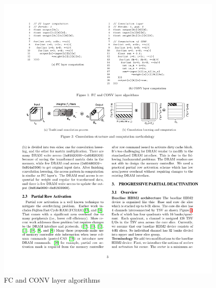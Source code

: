 \begin{figure}[ht]
\begin{minipage}[t][]{0.46\linewidth}
        \includegraphics[]{figure/conv.pdf}
    \end{minipage}
    \caption{FC and CONV layer algorithms}
    \label{fig:ch2:alg}
\end{figure}

